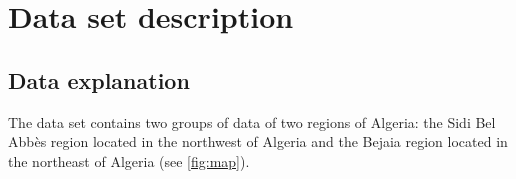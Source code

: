 \documentclass[10pt]{article}
\numberwithin{equation}{section}
\numberwithin{figure}{section}
\numberwithin{table}{section}
\begin{document}


\section{Data set description}
\subsection{Data explanation}
The data set contains two groups of data of two regions of Algeria: the Sidi Bel Abbès region located in the northwest of Algeria and the Bejaia region located in the northeast of Algeria (see \autoref{fig:map}).
\end{document}
